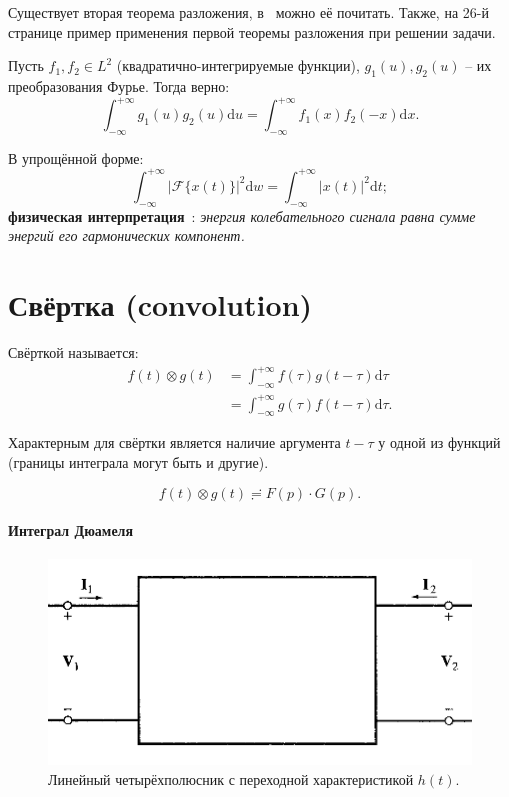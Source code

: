 \documentclass[12pt]{report}
\newcommand{\F}{\mathcal F}
\newcommand{\rd}{\mathrm d}
\begin{document}
\begin{rmk}
	Существует вторая теорема разложения, в~\cite[стр.~27]{Dubkov:Lecture} можно её почитать. 
	Также, на 26-й странице пример применения первой теоремы разложения при решении задачи.
\end{rmk}

\begin{thm}[Планшереля]
	Пусть $f_1,f_2 \in L^2$ (квадратично-интегрируемые функции), $g_1(u), g_2(u)$ -- их преобразования Фурье. Тогда верно:
	\[
	\int_{-\infty}^{+\infty} g_1(u)g_2(u)\rd u = \int_{-\infty}^{+\infty} f_1(x)f_2(-x)\rd x.
	\]
	
	В упрощённой форме:
	\[
	\int_{-\infty}^{+\infty} |\F\{x(t)\}|^2\rd w = \int_{-\infty}^{+\infty}|x(t)|^2\rd t;
	\]
	\textbf{физическая интерпретация}~\cite[после~ф-лы~8]{Plancherel}: \emph{энергия колебательного сигнала равна сумме энергий его гармонических компонент.}
\end{thm}

\section{Свёртка (convolution)}
Свёрткой называется:
\begin{align*}
f(t)\otimes g(t) &= \int_{-\infty}^{+\infty} f(\tau)g(t-\tau)\rd\tau \\
&= \int_{-\infty}^{+\infty} g(\tau)f(t-\tau)\rd\tau.
\end{align*}

\begin{rmk}
	Характерным для свёртки является наличие аргумента $t-\tau$ у одной из функций (границы интеграла могут быть и другие).
\end{rmk}

\begin{thm}
	\[
	f(t)\otimes g(t)\risingdotseq F(p)\cdot G(p).
	\]
\end{thm}

\paragraph{Интеграл Дюамеля}
\begin{figure}[h]\centering
	\includegraphics[width=\linewidth]{quadripole}
	\caption{Линейный четырёхполюсник с переходной характеристикой $h(t)$.\label{fig:quadripole}}
\end{figure}
\end{document}
